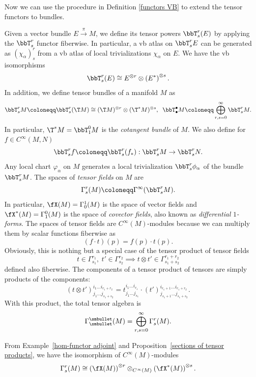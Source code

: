Now we can use the procedure in Definition \ref{functors VB} to extend the tensor functors to bundles.

\begin{defn}
    Given a vector bundle $E\overset{\pi}{\to}M$, we define its tensor powers $\bbT^r_s (E)$ by applying the $\bbT^r_s$ functor fiberwise. In particular, a \gls{vb} atlas on $\bbT^r_s E$ can be generated as $(\chi_\alpha)^r_s$ from a \gls{vb} atlas of local trivializations $\chi_\alpha$ on $E$.
    We have the \gls{vb} isomorphisms
    \[
    \bbT^r_s (E)\cong E^{\otimes r}\otimes \left(E^\ast\right)^{\otimes s}.
    \]
    In addition, we define tensor bundles of a manifold $M$ as
    \[
    \bbT^r_s M\coloneqq \bbT^r_s (\T M)\cong (\T M)^{\otimes r}\otimes (\T^\ast M)^{\otimes s},\;\; \bbT^\bullet_\bullet M\coloneqq \bigoplus_{r,s=0}^\infty \bbT^r_s M.
    \]
    In particular, $\T^\ast M=\bbT^0_1 M$ is the \emph{cotangent bundle} of $M$. We also define for $f\in C^\infty(M,N)$ 
    \[ \bbT^r_s f\coloneqq \bbT^r_s (f_\ast): \bbT^r_s M\to \bbT^r_s N.\]
    Any local chart $\varphi_\alpha$ on $M$ generates a local trivialization $\bbT^r_s \phi_\alpha$ of the bundle $\bbT^r_s M$.
    The spaces of \emph{tensor fields} on $M$ are 
    \[
    \Gamma^r_s(M)\coloneqq \Gamma^\infty(\bbT^r_s M).
    \]
    In particular, $\fX(M)=\Gamma^1_0(M)$ is the space of vector fields and $\fX^\ast(M)=\Gamma^0_1(M)$ is the space of \emph{covector fields}, also known as \emph{differential $1$-forms}. The spaces of tensor fields are $C^\infty(M)$-modules because we can multiply them by scalar functions fiberwise as
    \[
    (f\cdot t)(p)=f(p)\cdot t(p).
    \]
    Obviously, this is nothing but a special case of the tensor product of tensor fields
    \[t\in\Gamma^{r_1}_{s_1},\;t'\in\Gamma^{r_2}_{s_2}\implies t\otimes t' \in \Gamma^{r_1+r_2}_{s_1+s_2}\] defined also fiberwise. The components of a tensor product of tensors are simply products of the components:
    \[
    (t\otimes t')_{j_1 \ldots j_{s_1+s_2}}^{i_1\ldots i_{r_1+r_2}}=t_{j_1\ldots j_{s_1}}^{i_1\ldots i_{r_1}}\cdot (t')^{i_{r_1+1}\ldots i_{r_1+r_2}}_{j_{s_1+1}\ldots j_{s_1+s_2}}.
    \]
    With this product, the total tensor algebra is 
    \[\Gamma^{\smbullet }_{\smbullet }(M)=\bigoplus_{r,s=0}^\infty \Gamma^r_s(M).\]
\end{defn}


\begin{cor}
    From Example~\ref{hom-functor adjoint} and Proposition~\ref{sections of tensor products}, we have the isomorphism of $C^\infty(M)$-modules
    \[\Gamma^r_s (M)\cong \left(\fX(M)\right)^{\otimes r} \otimes_{C^\infty(M)}\left(\fX^\ast(M)\right)^{\otimes s}.\]
\end{cor}

